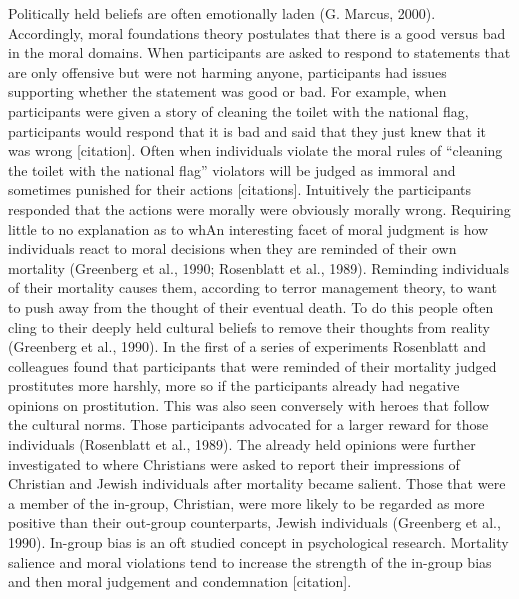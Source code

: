 \documentclass[
  english,
  donotrepeattitle,doc, 12pt, a4paper,floatsintext]{apa7}
\begin{document}
Politically held beliefs are often emotionally laden (G. Marcus, 2000). Accordingly, moral foundations theory postulates that there is a good versus bad in the moral domains. When participants are asked to respond to statements that are only offensive but were not harming anyone, participants had issues supporting whether the statement was good or bad. For example, when participants were given a story of cleaning the toilet with the national flag, participants would respond that it is bad and said that they just knew that it was wrong {[}citation{]}. Often when individuals violate the moral rules of ``cleaning the toilet with the national flag'' violators will be judged as immoral and sometimes punished for their actions {[}citations{]}. Intuitively the participants responded that the actions were morally were obviously morally wrong. Requiring little to no explanation as to whAn interesting facet of moral judgment is how individuals react to moral decisions when they are reminded of their own mortality (Greenberg et al., 1990; Rosenblatt et al., 1989). Reminding individuals of their mortality causes them, according to terror management theory, to want to push away from the thought of their eventual death. To do this people often cling to their deeply held cultural beliefs to remove their thoughts from reality (Greenberg et al., 1990). In the first of a series of experiments Rosenblatt and colleagues found that participants that were reminded of their mortality judged prostitutes more harshly, more so if the participants already had negative opinions on prostitution. This was also seen conversely with heroes that follow the cultural norms. Those participants advocated for a larger reward for those individuals (Rosenblatt et al., 1989). The already held opinions were further investigated to where Christians were asked to report their impressions of Christian and Jewish individuals after mortality became salient. Those that were a member of the in-group, Christian, were more likely to be regarded as more positive than their out-group counterparts, Jewish individuals (Greenberg et al., 1990). In-group bias is an oft studied concept in psychological research. Mortality salience and moral violations tend to increase the strength of the in-group bias and then moral judgement and condemnation {[}citation{]}.
\end{document}
